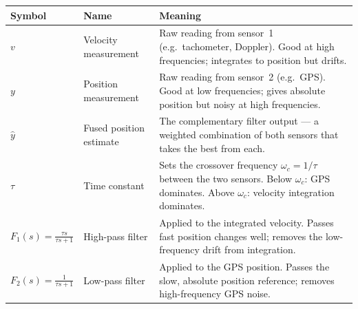\documentclass[12pt, a4paper]{article}
\begin{document}
\begin{center}
\begin{tabular}{@{} l p{3.0cm} p{7.5cm} @{}}
  \toprule
  Symbol & Name & Meaning \\
  \midrule
  $v$ & Velocity measurement &
    Raw reading from sensor~1 (e.g.\ tachometer, Doppler).
    Good at high frequencies; integrates to position but drifts. \\[3pt]
  $y$ & Position measurement &
    Raw reading from sensor~2 (e.g.\ GPS).
    Good at low frequencies; gives absolute position but noisy at high
    frequencies. \\[3pt]
  $\hat{y}$ & Fused position estimate &
    The complementary filter output --- a weighted combination of both
    sensors that takes the best from each. \\[3pt]
  $\tau$ & Time constant &
    Sets the crossover frequency $\omega_c = 1/\tau$ between the two
    sensors.
    Below $\omega_c$: GPS dominates.
    Above $\omega_c$: velocity integration dominates. \\[3pt]
  $F_1(s) = \tfrac{\tau s}{\tau s+1}$ & High-pass filter &
    Applied to the integrated velocity.
    Passes fast position changes well; removes the low-frequency drift
    from integration. \\[3pt]
  $F_2(s) = \tfrac{1}{\tau s+1}$ & Low-pass filter &
    Applied to the GPS position.
    Passes the slow, absolute position reference; removes high-frequency
    GPS noise. \\
  \bottomrule
\end{tabular}
\end{center}
\end{document}
